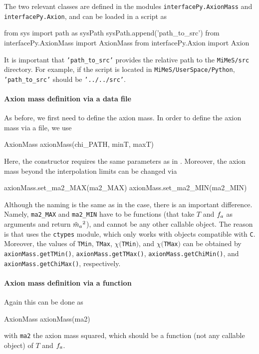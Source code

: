 \documentclass[11pt,a4paper]{article}
\begin{document}
 
The two relevant classes are defined in the modules {\tt interfacePy.AxionMass} and {\tt interfacePy.Axion}, and can be loaded in a \PY script as 
%
\begin{py}
	from sys import path as sysPath
	sysPath.append('path_to_src')
	from interfacePy.AxionMass import AxionMass
	from interfacePy.Axion import Axion
\end{py}
%
It is important that {\tt 'path\_to\_src'} provides the relative path to the {\tt MiMeS/src} directory. For example, if the script is located in {\tt MiMeS/UserSpace/Python}, {\tt 'path\_to\_src'} should be {\tt '../../src'}.

\paragraph{Axion mass definition via a data file}
As before, we first need to define the axion mass. In order to define the axion mass via a file, we use
%
\begin{py}
	AxionMass axionMass(chi_PATH, minT, maxT)
\end{py}
%
Here, the constructor requires the same parameters as in \CPP. Moreover, the axion mass beyond the interpolation limits can be changed via
%
\begin{py}
	axionMass.set_ma2_MAX(ma2_MAX)
	axionMass.set_ma2_MIN(ma2_MIN)
\end{py}
%
Although the naming is the same as in the \CPP case, there is an important difference. Namely, {\tt ma2\_MAX} and {\tt ma2\_MIN} have to be functions (that take $T$ and $f_{a}{}$ as arguments and return $\tilde m_{a}{}^2$), and cannot be any other callable object. The reason is that \mimes uses the {\tt ctypes} module, which only works with objects compatible with {\tt C}. 
%
Moreover, the values of {\tt TMin}, {\tt TMax}, $\chi(${\tt TMin}$)$, and $\chi(${\tt TMax}$)$ can be obtained by {\tt axionMass.getTMin()}, {\tt axionMass.getTMax()}, {\tt axionMass.getChiMin()}, and {\tt axionMass.getChiMax()}, respectively.

\paragraph{Axion mass definition via a function}
%
Again this can be done as
%
\begin{py}
	AxionMass axionMass(ma2)
\end{py}
%
with {\tt ma2} the axion mass squared, which should be a function (not any callable object) of $T$ and $f_{a}{}$.
\end{document}
